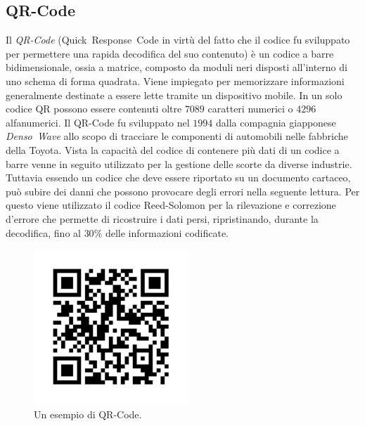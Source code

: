 \subsection{QR-Code}
	\label{subsec:qrcode}
Il \emph{QR-Code} (Quick~Response~Code in virtù del fatto che il codice fu sviluppato per permettere una rapida decodifica del suo contenuto) è un codice a barre bidimensionale, ossia a matrice, composto da moduli neri disposti all'interno di uno schema di forma quadrata. Viene impiegato per memorizzare informazioni generalmente destinate a essere lette tramite un dispositivo mobile. In un solo codice QR possono essere contenuti oltre $7089$ caratteri numerici o $4296$ alfanumerici.
Il QR-Code fu sviluppato nel $1994$ dalla compagnia giapponese \emph{Denso~Wave} allo scopo di tracciare le componenti di automobili nelle fabbriche della Toyota. Vista la capacità del codice di contenere più dati di un codice a barre venne in seguito utilizzato per la gestione delle scorte da diverse industrie.
Tuttavia essendo un codice che deve essere riportato su un documento cartaceo, può subire dei danni che possono provocare degli errori nella seguente lettura.
Per questo viene utilizzato il codice Reed-Solomon per la rilevazione e correzione d'errore che permette di ricostruire i dati persi, ripristinando, durante la decodifica, fino al $30\%$ delle informazioni codificate.

	\begin{center}	
		\begin{figure}[H]
		\centering
		\includegraphics[scale=0.9]{Immagini/qrcode}
		\caption[Esempio di QR-Code]{Un esempio di QR-Code.}
		\label{fig:usecase}
		\end{figure}
	\end{center}

